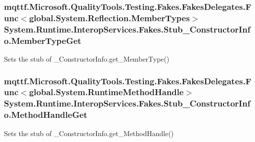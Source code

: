 \hypertarget{class_system_1_1_runtime_1_1_interop_services_1_1_fakes_1_1_stub___constructor_info_a451d7ed2918563d115e7f320c88e625b}{
\subsubsection[{Member\-Type\-Get}]{\setlength{\rightskip}{0pt plus 5cm}mqttf.\-Microsoft.\-Quality\-Tools.\-Testing.\-Fakes.\-Fakes\-Delegates.\-Func$<$global.\-System.\-Reflection.\-Member\-Types$>$ System.\-Runtime.\-Interop\-Services.\-Fakes.\-Stub\-\_\-\-Constructor\-Info.\-Member\-Type\-Get}}\label{class_system_1_1_runtime_1_1_interop_services_1_1_fakes_1_1_stub___constructor_info_a451d7ed2918563d115e7f320c88e625b}


Sets the stub of \-\_\-\-Constructor\-Info.\-get\-\_\-\-Member\-Type()

\hypertarget{class_system_1_1_runtime_1_1_interop_services_1_1_fakes_1_1_stub___constructor_info_a5a05b2c04a72cfeab914a7661cbbc4b3}{
\subsubsection[{Method\-Handle\-Get}]{\setlength{\rightskip}{0pt plus 5cm}mqttf.\-Microsoft.\-Quality\-Tools.\-Testing.\-Fakes.\-Fakes\-Delegates.\-Func$<$global.\-System.\-Runtime\-Method\-Handle$>$ System.\-Runtime.\-Interop\-Services.\-Fakes.\-Stub\-\_\-\-Constructor\-Info.\-Method\-Handle\-Get}}\label{class_system_1_1_runtime_1_1_interop_services_1_1_fakes_1_1_stub___constructor_info_a5a05b2c04a72cfeab914a7661cbbc4b3}


Sets the stub of \-\_\-\-Constructor\-Info.\-get\-\_\-\-Method\-Handle()


